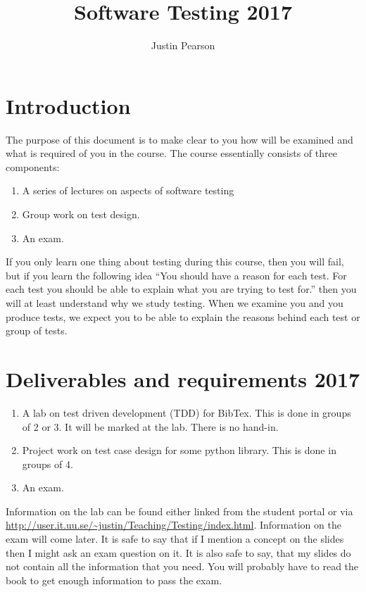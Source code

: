 \documentclass[a4page]{article}
\title{Software Testing 2017}
\author{Justin Pearson}
\begin{document}
\maketitle


\section{Introduction}
The purpose of this document is to make clear to you how will be
examined and what is required of you in the course.  The course
essentially consists  of three components:
\begin{enumerate}
\item A series of lectures on aspects of software testing
\item Group work on test design.
\item An exam.
\end{enumerate}

If you only learn one thing about testing during this course, then you
will fail, but if you learn the following idea ``You should have a
reason for each test. For each test you should be able to explain what
you are trying to test for.'' then
you will at least understand why we study testing. When we examine you
and you produce tests, we expect you to be able to explain the reasons
behind each test or group of tests.


\section{Deliverables and requirements  2017}



\begin{enumerate}
\item A lab on  test driven development (TDD) for  BibTex.   This is
  done in groups of 2 or 3. It will be marked at the lab. There is no
  hand-in. 


\item Project work on test case design for some python library. This
  is done in groups of 4.
\item An exam.

  \end{enumerate}


Information on the lab can be found either linked from the student portal or via
  \url{http://user.it.uu.se/~justin/Teaching/Testing/index.html}. Information
  on the exam will come later. It is safe to say that if I mention a
  concept on the slides then I might ask an exam question on it. It is
  also safe to say, that my slides do not contain all the information
  that you need. You will probably have to read the book to get enough
  information to pass the exam.
\end{document}
